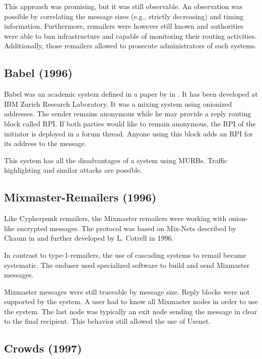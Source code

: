 This approach was promising, but it was still observable. An observation was possible by correlating the message sizes (e.g., strictly decreasing) and timing information. Furthermore, remailers were however still known and authorities were able to ban infrastructure and capable of monitoring their routing activities. Additionally, those remailers allowed to prosecute administrators of such systems.

\subsection{Babel (1996)}
Babel was an academic system defined in a paper by \citeauthor{babel} in \citeyear{babel}\cite{babel}. It has been developed at IBM Zurich Research Laboratory. It was a mixing system using onionized addresses. The sender remains anonymous while he may provide a reply routing block called RPI. If both parties would like to remain anonymous, the RPI of the initiator is deployed in a forum thread. Anyone using this block adds an RPI for its address to the message.

This system has all the disadvantages of a system using MURBs. Traffic highlighting and similar attacks are possible.

\subsection{Mixmaster-Remailers (1996)\label{sec:remMixmaster}}
Like Cypherpunk remailers, the Mixmaster remailers were working with onion-like encrypted messages. The protocol was based on Mix-Nets described by Chaum in \cite{CHAUM1} and further developed by L. Cotrell in 1996. 

In contrast to type-1-remailers, the use of cascading systems to remail became systematic. The enduser used specialized software to build and send Mixmaster messages.

Mixmaster messages were still traceable by message size. Reply blocks were not supported by the system. A user had to know all Mixmaster nodes in order to use the system. The last node was typically an exit node sending the message in clear to the final recipient. This behavior still allowed the use of Usenet.

\subsection{Crowds (1997)}




